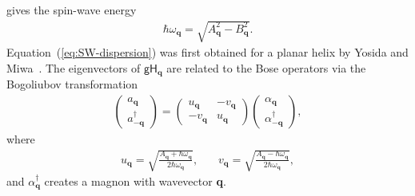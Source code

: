 \documentclass[aps,prl,amsmath,amssymb,amstext,citeautoscript,punctuation,nofootinbib,superscriptaddress,twocolumn]{revtex4-1}
\begin{document}
gives the spin-wave energy
\begin{align}
\hbar\omega_\textbf{q} = \sqrt{A^2_\textbf{q} - B^2_\textbf{q}}.
\label{eq:SW-dispersion}
\end{align}
Equation~(\ref{eq:SW-dispersion}) was first obtained for a planar helix by Yosida and Miwa~\cite{Yosida-Miwa-JAP}.
The eigenvectors of $\textsf{g}\textsf{H}_\textbf{q}$ are related to the Bose operators via the Bogoliubov transformation
\begin{align}
\left(\begin{array}{c}a_\textbf{q} \\ a^\dag_{-\textbf{q}}\end{array}\right) = \left(\begin{array}{cc}u_\textbf{q} & -v_\textbf{q} \\ -v_\textbf{q} & u_\textbf{q}\end{array} \right) \left(\begin{array}{c}\alpha_\textbf{q} \\ \alpha^\dag_{-\textbf{q}}\end{array}\right),
\label{eq:Bogoliubov}
\end{align}
where
\begin{align}
u_\textbf{q}  = \sqrt{\frac{A_\textbf{q}+\hbar\omega_\textbf{q}}{2\hbar\omega_\textbf{q}}},\ \ \ \ \ \ \ \  
v_\textbf{q} = \sqrt{\frac{A_\textbf{q}-\hbar\omega_\textbf{q}}{2\hbar\omega_\textbf{q}}},
\end{align}
and $\alpha^\dag_\textbf{q}$ creates a magnon with wavevector \textbf{q}.
\end{document}
